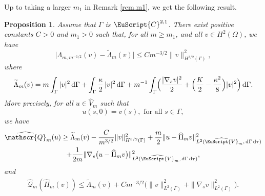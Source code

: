 \documentclass[10pt]{amsart}
\let\mathcal \EuScript
\newcommand{\scrQ}{\mathscr{Q}}
\newcommand{\cC}{\mathcal{C}}
\newcommand{\cV}{\mathcal{V}}
\theoremstyle{plain}
\newtheorem{proposition}[theorem]{Proposition}
\theoremstyle{definition}
\newcommand{\dx}{\mathrm{\,d}}
\begin{document}
Up to taking a larger $m_1$ in Remark \ref{rem.m1}, we get the following result.

\begin{proposition}\label{lem:effop}
Assume that $\Gamma$ is $\cC^{2,1}$.
There exist positive constants $C>0$ and $m_1>0$ such that, for all $m\geq m_1$, and all $v\in H^{2}(\Omega)$, we have
\[
\big|\Lambda_{m,m^{-1/2}}(v)-\widetilde \Lambda_{m}(v)\big|\leq Cm^{-3/2}\|v\|^2_{H^{3/2}(\Gamma)},
\]
where
\[
\widetilde \Lambda_{m}(v) = m\int_\Gamma
|v|^2
\dx\Gamma
+
\int_\Gamma
\frac{\kappa}{2}\,|v|^2
\dx\Gamma
+
m^{-1}\int_\Gamma \Bigl(
\frac{|\nabla_s v|^2}{2}
+
\Bigl(\frac{K}{2}-\frac{\kappa^2}{8} \Bigr)|v|^2
\Bigr)\dx\Gamma.
\]
More precisely, for all $u\in \widehat{V}_m$ such that
\[
u(s,0)= v(s), \mbox{ for all }s\in \Gamma,
\]
we have
\begin{multline*}
\widehat{\scrQ}_m(u)\geq \widetilde \Lambda_{m}(v)
-\frac{C}{m^{3/2}} \|v\|_{H^{3/2}(\Gamma)} ^2
+\frac{m}{2}
\|u-\widehat{\Pi}_m v\|^2_{L^2(\widehat{\cV}_m, \dx\Gamma\dx\tau)}
\\
+\frac{1}{2m}
\|\nabla_s \bigl(u - \widehat{\Pi}_m v\bigr)\|^2_{L^2(\widehat{\cV}_m, \dx\Gamma\dx\tau)},
\end{multline*}
and
\[\begin{split}
\widehat{\scrQ}_m(\widehat{\Pi}_m(v))\leq \widetilde \Lambda_{m}(v)
+Cm^{-3/2} \bigl(\|v\|^2_{L^2(\Gamma)} + \|\nabla_s v\|^2_{L^2(\Gamma)}\bigr).
\end{split}\]
\end{proposition}
\end{document}
